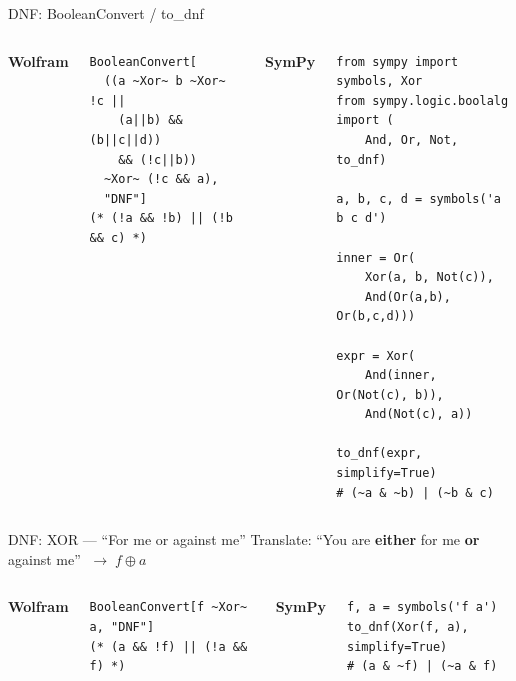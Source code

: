 \documentclass[aspectratio=169]{beamer}
\newcommand{\codelabel}[1]{\textbf{\footnotesize\color{dmDarkBlue}#1}\par\smallskip}
\begin{document}
\begin{frame}[fragile]{DNF: BooleanConvert / to\_dnf}
  \begin{columns}[T]
      \codelabel{Wolfram}
\begin{lstlisting}[style=wolfram]
BooleanConvert[
  ((a ~Xor~ b ~Xor~ !c ||
    (a||b) && (b||c||d))
    && (!c||b))
  ~Xor~ (!c && a),
  "DNF"]
(* (!a && !b) || (!b && c) *)
\end{lstlisting}
      \codelabel{SymPy}
\begin{lstlisting}[style=python]
from sympy import symbols, Xor
from sympy.logic.boolalg import (
    And, Or, Not, to_dnf)

a, b, c, d = symbols('a b c d')

inner = Or(
    Xor(a, b, Not(c)),
    And(Or(a,b), Or(b,c,d)))

expr = Xor(
    And(inner, Or(Not(c), b)),
    And(Not(c), a))

to_dnf(expr, simplify=True)
# (~a & ~b) | (~b & c)
\end{lstlisting}
  \end{columns}
\end{frame}

\begin{frame}[fragile]{DNF: XOR — ``For me or against me''}
  Translate: ``You are \textbf{either} for me \textbf{or} against me''
  $\;\longrightarrow\; f \oplus a$

  \medskip
  \begin{columns}[T]
      \codelabel{Wolfram}
\begin{lstlisting}[style=wolfram]
BooleanConvert[f ~Xor~ a, "DNF"]
(* (a && !f) || (!a && f) *)
\end{lstlisting}
      \codelabel{SymPy}
\begin{lstlisting}[style=python]
f, a = symbols('f a')
to_dnf(Xor(f, a), simplify=True)
# (a & ~f) | (~a & f)
\end{lstlisting}
  \end{columns}
\end{frame}
\end{document}
